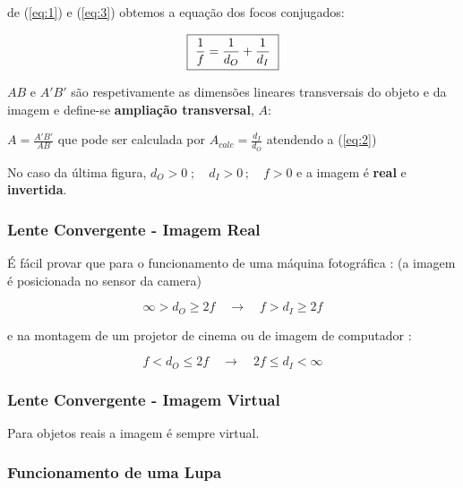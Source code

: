 \documentclass[a4paper,12pt]{article}      %
\begin{document}
de (\ref{eq:1}) e (\ref{eq:3}) obtemos a equação dos focos conjugados:
 
 \begin{equation}
	\label{eq:focosconjug}
    \fbox{
        $ \displaystyle
	\frac{1}{f} = \frac{1}{d_O} +\frac{1}{d_I} 
        $
    }
\end{equation}



$AB$ e $A'B'$ são respetivamente as dimensões lineares transversais do objeto e da imagem  e define-se \textbf{ampliação transversal}, $A$:

$A =  \frac{A'B'}{ AB} $ que pode ser calculada por $A_{calc}=\frac{d_I}{d_O} $ atendendo a (\ref{eq:2})

No caso da última figura, $d_O > 0\;; \quad d_I > 0\,; \quad f > 0$ e a imagem é \textbf{real} e \textbf{invertida}.

\subsubsection{\sf Lente Convergente -  Imagem Real}
É fácil provar que para o funcionamento de uma máquina fotográfica  :
(a imagem é posicionada no sensor da camera)

\begin{equation}
\infty > d_O \ge 2 f \quad \to \quad f > d_I \ge 2 f  
\end{equation}

e na montagem de um projetor de cinema ou de imagem de computador  :

\begin{equation}
f < d_O \le 2 f  \quad \to  \quad  2 f \le d_I < \infty 
\end{equation}

\subsubsection{\sf Lente Convergente - Imagem Virtual}
Para objetos reais a imagem é sempre virtual.
\subsubsection{\sf Funcionamento de uma Lupa}
\end{document}

